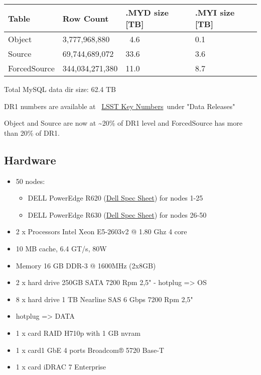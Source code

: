 \begin{longtable}[]{@{}llll@{}}
\toprule
\textbf{Table} & \textbf{Row Count} & \textbf{.MYD size {[}TB{]}} &
\textbf{.MYI size {[}TB{]}}\tabularnewline
\midrule
\endhead
Object & 3,777,968,880 & ~4.6 & 0.1\tabularnewline
Source & 69,744,689,072 & 33.6 & 3.6\tabularnewline
ForcedSource & 344,034,271,380 & 11.0 & 8.7\tabularnewline
\bottomrule
\end{longtable}

Total MySQL data dir size: 62.4 TB

DR1 numbers are available at~
\href{https://www.lsst.org/scientists/keynumbers}{LSST Key
Numbers}~under "Data Releases"

Object and Source are now at \textasciitilde{}20\% of DR1 level and
ForcedSource has more than 20\% of DR1.

\subsection{Hardware}\label{hardware}

\begin{itemize}
\item
  50 nodes:

  \begin{itemize}
  \item
    DELL PowerEdge R620
    (\href{http://www.dell.com/downloads/global/products/pedge/en/Dell_PowerEdge_R620_Spec_Sheet.pdf}{Dell
    Spec Sheet}) for nodes 1-25
  \item
    DELL PowerEdge R630
    (\href{http://i.dell.com/sites/doccontent/shared-content/data-sheets/en/Documents/Dell-PowerEdge-R630-Spec-Sheet.pdf}{Dell
    Spec Sheet}) for nodes 26-50
  \end{itemize}
\item
  2 x Processors Intel Xeon E5-2603v2 @ 1.80 Ghz 4 core
\item
  10 MB cache, 6.4 GT/s, 80W
\item
  Memory 16 GB DDR-3 @ 1600MHz (2x8GB)
\item
  2 x hard drive 250GB SATA 7200 Rpm 2,5" - hotplug =\textgreater{} OS
\item
  8 x hard drive 1 TB Nearline SAS 6 Gbps 7200 Rpm 2,5"
\item
  hotplug =\textgreater{} DATA
\item
  1 x card RAID H710p with 1 GB nvram
\item
  1 x card1 GbE 4 ports Broadcom® 5720 Base-T
\item
  1 x card iDRAC 7 Enterprise
\end{itemize}

